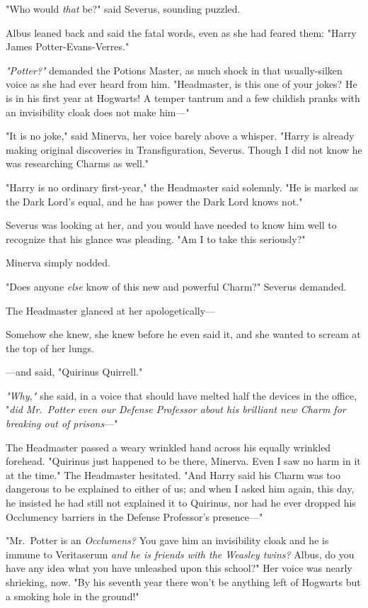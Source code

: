 "Who would \emph{that} be?" said Severus, sounding puzzled.

Albus leaned back and said the fatal words, even as she had feared them: "Harry
James Potter-Evans-Verres."

\emph{"Potter?"} demanded the Potions Master, as much shock in that
usually-silken voice as she had ever heard from him. "Headmaster, is this one
of your jokes? He is in his first year at Hogwarts! A temper tantrum and a few
childish pranks with an invisibility cloak does not make him\mbox{---}"

"It is no joke," said Minerva, her voice barely above a whisper. "Harry is
already making original discoveries in Transfiguration, Severus. Though I did
not know he was researching Charms as well."

"Harry is no ordinary first-year," the Headmaster said solemnly. "He is marked
as the Dark Lord's equal, and he has power the Dark Lord knows not."

Severus was looking at her, and you would have needed to know him well to
recognize that his glance was pleading. "Am I to take this seriously?"

Minerva simply nodded.

"Does anyone \emph{else} know of this{\el} new and powerful Charm?" Severus
demanded.

The Headmaster glanced at her apologetically\mbox{---}

Somehow she knew, she knew before he even said it, and she wanted to scream at
the top of her lungs.

---and said, "Quirinus Quirrell."

\emph{"Why,"} she said, in a voice that should have melted half the devices in
the office, "\emph{did Mr.~Potter even  our Defense Professor about his
brilliant new Charm for breaking out of prisons}\mbox{---}"

The Headmaster passed a weary wrinkled hand across his equally wrinkled
forehead. "Quirinus just happened to be there, Minerva. Even I saw no harm in
it at the time." The Headmaster hesitated. "And Harry said his Charm was too
dangerous to be explained to either of us; and when I asked him again, this
day, he insisted he had still not explained it to Quirinus, nor had he ever
dropped his Occlumency barriers in the Defense Professor's presence\mbox{---}"

"Mr.~Potter is an \emph{Occlumens?} You gave him an invisibility cloak and he
is immune to Veritaserum \emph{and he is friends with the Weasley twins?}
Albus, do you have any idea what you have unleashed upon this school?" Her
voice was nearly shrieking, now. "By his seventh year there won't be anything
left of Hogwarts but a smoking hole in the ground!"

